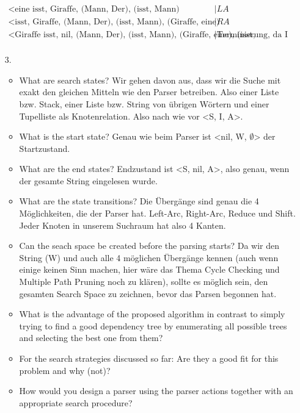 \documentclass[ngerman]{fbi-aufgabenblatt}
\begin{document}
\begin{itemize}
\begin{align}
		\text{<eine isst, Giraffe, {(Mann, Der), (isst, Mann)}} &| LA\\
		\text{<isst, Giraffe, {(Mann, Der), (isst, Mann), (Giraffe, eine)}} &| RA\\
		\text{<Giraffe isst, nil, {(Mann, Der), (isst, Mann), (Giraffe, eine), (isst, Giraffe)}} &| \text{Terminierung, da I = nil}\\
	\end{align}
	\item[3.]
	\begin{itemize}
		\item What are search states? \newline Wir gehen davon aus, dass wir die Suche mit exakt den gleichen Mitteln wie den Parser betreiben. Also einer Liste bzw. Stack, einer Liste 				bzw. String von übrigen Wörtern und einer Tupelliste als Knotenrelation. Also nach wie vor <S, I, A>.
		\item What is the start state? \newline Genau wie beim Parser ist <nil, W, \(\emptyset\)> der Startzustand.
		\item What are the end states? \newline Endzustand ist <S, nil, A>, also genau, wenn der gesamte String eingelesen wurde.
		\item What are the state transitions? \newline Die Übergänge sind genau die 4 Möglichkeiten, die der Parser hat. Left-Arc, Right-Arc, Reduce und Shift. Jeder Knoten in unserem 				Suchraum hat also 4 Kanten.
		\item Can the seach space be created before the parsing starts? \newline Da wir den String (W) und auch alle 4 möglichen Übergänge kennen (auch wenn einige keinen Sinn machen, 		hier wäre das Thema Cycle Checking und Multiple Path Pruning noch zu klären), sollte es möglich sein, den gesamten Search Space zu zeichnen, bevor das Parsen begonnen hat.
		\item What is the advantage of the proposed algorithm in contrast to simply trying to find a good dependency tree by enumerating all possible trees and selecting the best one from 			them? \newline
		\item For the search strategies discussed so far: Are they a good fit for this problem and why (not)? \newline 
		\item How would you design a parser using the parser actions together with an appropriate search procedure? \newline
	\end{itemize}
\end{itemize}
\end{document}
